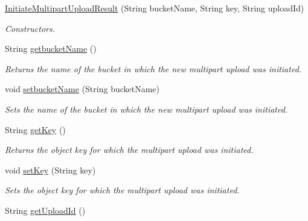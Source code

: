 \begin{DoxyCompactItemize}
\item 
\hyperlink{classorg_1_1jcs_1_1dss_1_1main_1_1InitiateMultipartUploadResult_ae08e52d9e817b750146147372f56a62c}{Initiate\+Multipart\+Upload\+Result} (String bucket\+Name, String key, String upload\+Id)\hypertarget{classorg_1_1jcs_1_1dss_1_1main_1_1InitiateMultipartUploadResult_ae08e52d9e817b750146147372f56a62c}{}\label{classorg_1_1jcs_1_1dss_1_1main_1_1InitiateMultipartUploadResult_ae08e52d9e817b750146147372f56a62c}

\begin{DoxyCompactList}\small\item\em Constructors. \end{DoxyCompactList}\item 
String \hyperlink{classorg_1_1jcs_1_1dss_1_1main_1_1InitiateMultipartUploadResult_a7daa1175ac6195781de98ec1c497309a}{getbucket\+Name} ()
\begin{DoxyCompactList}\small\item\em Returns the name of the bucket in which the new multipart upload was initiated. \end{DoxyCompactList}\item 
void \hyperlink{classorg_1_1jcs_1_1dss_1_1main_1_1InitiateMultipartUploadResult_add69a6efd568c384fdb4886b8f49ca5d}{setbucket\+Name} (String bucket\+Name)
\begin{DoxyCompactList}\small\item\em Sets the name of the bucket in which the new multipart upload was initiated. \end{DoxyCompactList}\item 
String \hyperlink{classorg_1_1jcs_1_1dss_1_1main_1_1InitiateMultipartUploadResult_a65c754660014bd29970ffcfed46a33cc}{get\+Key} ()
\begin{DoxyCompactList}\small\item\em Returns the object key for which the multipart upload was initiated. \end{DoxyCompactList}\item 
void \hyperlink{classorg_1_1jcs_1_1dss_1_1main_1_1InitiateMultipartUploadResult_a30c9744dbe010faf5d1e70b0d4f906ef}{set\+Key} (String key)
\begin{DoxyCompactList}\small\item\em Sets the object key for which the multipart upload was initiated. \end{DoxyCompactList}\item 
String \hyperlink{classorg_1_1jcs_1_1dss_1_1main_1_1InitiateMultipartUploadResult_a6a34dc494b699c00066f70fed0ff561c}{get\+Upload\+Id} ()

\end{DoxyCompactItemize}
